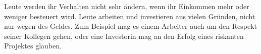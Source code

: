 Leute werden ihr Verhalten nicht sehr ändern, wenn ihr Einkommen mehr oder weniger besteuert wird.
Leute arbeiten und investieren aus vielen Gründen, nicht nur wegen des Geldes.
Zum Beispiel mag es einem Arbeiter auch um den Respekt seiner Kollegen gehen, oder eine Investorin mag an den Erfolg eines riskanten Projektes glauben.